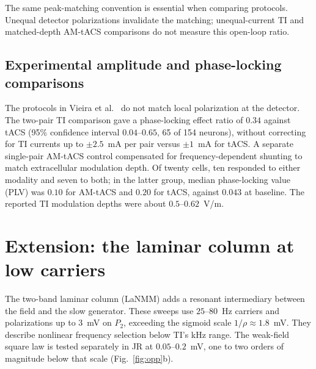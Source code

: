 \documentclass[11pt,a4paper]{article}
\providecommand{\DIFaddtex}[1]{{\protect\color{blue} \sf #1}} %
\providecommand{\DIFadd}[1]{\texorpdfstring{\DIFaddtex{#1}}{#1}} %
\begin{document}
\DIFadd{The same peak-matching convention is essential when comparing protocols.
Unequal detector polarizations invalidate the matching; unequal-current TI
and matched-depth AM-tACS comparisons do not measure this open-loop ratio.
}

\subsection{\DIFadd{Experimental amplitude and phase-locking comparisons}}\label{supp:vieira}
\DIFadd{The protocols in Vieira et al.\ \cite{vieira2024} do not match local polarization at the detector.
The two-pair TI comparison gave a phase-locking effect ratio of $0.34$ against
tACS (95\% confidence interval $0.04$--$0.65$, 65 of 154 neurons), without
correcting for TI currents up to $\pm2.5$~mA per pair versus $\pm1$~mA for tACS.
A separate single-pair AM-tACS control compensated for frequency-dependent
shunting to match extracellular modulation depth. Of twenty cells, ten responded
to either modality and seven to both; in the latter group, median phase-locking
value (PLV) was $0.10$ for AM-tACS and $0.20$ for tACS, against $0.043$ at baseline.
The reported TI modulation depths were about $0.5$--$0.62$~V/m.
}


\section{\DIFadd{Extension: the laminar column at low carriers}}\label{app:lanmm}
\DIFadd{The two-band laminar column (LaNMM) adds a resonant intermediary
between the field and the slow generator. These sweeps use $25$--$80$~Hz carriers
and polarizations up to $3$~mV on $P_2$, exceeding the sigmoid scale
$1/\rho\approx1.8$~mV. They describe nonlinear frequency selection below TI's
kHz range. The weak-field square law is tested separately in JR at
$0.05$--$0.2$~mV, one to two orders of magnitude below that scale
(Fig.~\ref{fig:opp}b).
}
\end{document}
